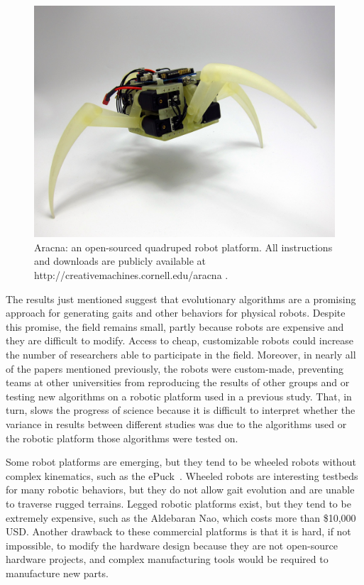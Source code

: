 \documentclass[letterpaper]{article}
\begin{document}
\begin{figure}[t]
\begin{center}
\includegraphics[width=\columnwidth]{fig1.jpg}
\caption{Aracna: an open-sourced quadruped robot platform. All
  instructions and downloads are publicly available at
  http://creativemachines.cornell.edu/aracna .}
\label{fig1}
\end{center}
\end{figure}

The results just mentioned suggest that evolutionary algorithms are a promising approach for generating gaits and other behaviors for physical robots. Despite this promise, the field remains small, partly because robots are expensive and they are difficult to modify. Access to cheap, customizable robots could increase the number of researchers able to participate in the field. Moreover, in nearly all of the papers mentioned previously, the robots were custom-made, preventing teams at other universities from reproducing the results of other groups and or testing new algorithms on a robotic platform used in a previous study. That, in turn, slows the progress of science because it is difficult to interpret whether the variance in results between different studies was due to the algorithms used or the robotic platform those algorithms were tested on.  

Some robot platforms are emerging, but they tend to be wheeled robots without complex kinematics, such as the ePuck~\citep{mondada2009puck}. Wheeled robots are interesting testbeds for many robotic behaviors, but they do not allow gait evolution and are unable to traverse rugged terrains. Legged robotic platforms exist, but they tend to be extremely expensive, such as the Aldebaran Nao, which costs more than \$10,000 USD. Another drawback to these commercial platforms is that it is hard, if not impossible, to modify the hardware design because they are not open-source hardware projects, and complex manufacturing tools would be required to manufacture new parts. 
\end{document}
